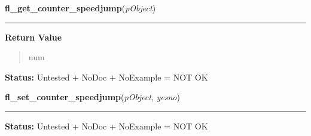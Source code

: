     \vspace{0.5ex}

\hspace{.8\funcindent}\begin{boxedminipage}{\funcwidth}

    \raggedright \textbf{fl\_get\_counter\_speedjump}(\textit{pObject})

    \vspace{-1.5ex}

    \rule{\textwidth}{0.5\fboxrule}
\setlength{\parskip}{2ex}
\setlength{\parskip}{1ex}
      \textbf{Return Value}
    \vspace{-1ex}

      \begin{quote}
      num

      \end{quote}

\textbf{Status:} Untested + NoDoc + NoExample = NOT OK



    \end{boxedminipage}

    \label{xformslib:library:fl_set_counter_speedjump}

    \vspace{0.5ex}

\hspace{.8\funcindent}\begin{boxedminipage}{\funcwidth}

    \raggedright \textbf{fl\_set\_counter\_speedjump}(\textit{pObject}, \textit{yesno})

    \vspace{-1.5ex}

    \rule{\textwidth}{0.5\fboxrule}
\setlength{\parskip}{2ex}
\setlength{\parskip}{1ex}
\textbf{Status:} Untested + NoDoc + NoExample = NOT OK



    \end{boxedminipage}

    \label{xformslib:library:fl_set_cursor}

    \vspace{0.5ex}

